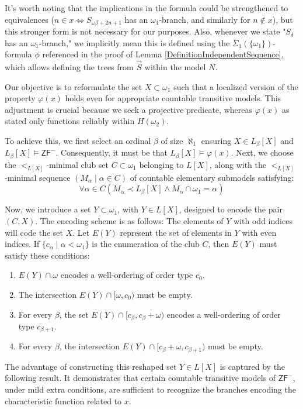 \documentclass[a4paper,11pt]{article}
\newcommand{\ZFP}{\mathsf{ZF}^-}
\begin{document}
It's worth noting that the implications in the formula could be strengthened to equivalences ($n \in x \Leftrightarrow S_{\omega \beta + 2n + 1}$ has an $\omega_1$-branch, and similarly for $n \notin x$), but this stronger form is not necessary for our purposes. Also, whenever we state "$S_{\delta}$ has an $\omega_1$-branch," we implicitly mean this is defined using the $\Sigma_1(\{\omega_1\})$-formula $\phi$ referenced in the proof of Lemma \ref{DefinitionIndependentSequence}, which allows defining the trees from $\vec{S}$ within the model $N$.

Our objective is to reformulate the set $X \subset \omega_1$ such that a localized version of the property $\varphi(x)$ holds even for appropriate countable transitive models. This adjustment is crucial because we seek a projective predicate, whereas $\varphi(x)$ as stated only functions reliably within $H(\omega_2)$.

To achieve this, we first select an ordinal $\beta$ of size $\aleph_1$ ensuring $X \in L_{\beta}[X]$ and $L_{\beta}[X] \models \ZFP$. Consequently, it must be that $L_{\beta}[X] \models \varphi(x)$. Next, we choose the $<_{L[X]}$-minimal club set $C \subset \omega_1$ belonging to $L[X]$, along with the $<_{L[X]}$-minimal sequence $(M_{\alpha} \mid \alpha \in C)$ of countable elementary submodels satisfying:
\[ \forall \alpha \in C (M_{\alpha} \prec L_{\beta}[X] \land M_{\alpha} \cap \omega_1 = \alpha) \]

Now, we introduce a set $Y \subset \omega_1$, with $Y \in L[X]$, designed to encode the pair $(C, X)$. The encoding scheme is as follows: The elements of $Y$ with odd indices will code the set $X$. Let $E(Y)$ represent the set of elements in $Y$ with even indices. If $\{c_{\alpha} \mid \alpha < \omega_1\}$ is the enumeration of the club $C$, then $E(Y)$ must satisfy these conditions:
\begin{enumerate}
    \item $E(Y) \cap \omega$ encodes a well-ordering of order type $c_0$.
    \item The intersection $E(Y) \cap [\omega, c_0)$ must be empty.
    \item For every $\beta$, the set $E(Y) \cap [c_{\beta}, c_{\beta} + \omega)$ encodes a well-ordering of order type $c_{\beta+1}$.
    \item For every $\beta$, the intersection $E(Y) \cap [c_{\beta}+\omega, c_{\beta+1})$ must be empty.
\end{enumerate}
The advantage of constructing this reshaped set $Y \in L[X]$ is captured by the following result. It demonstrates that certain countable transitive models of $\ZFP$, under mild extra conditions, are sufficient to recognize the branches encoding the characteristic function related to $x$.
\end{document}
